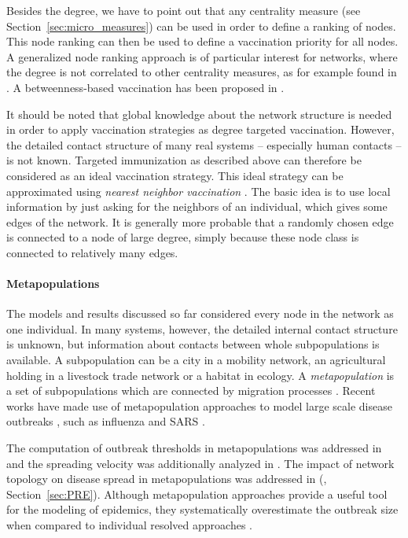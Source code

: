 Besides the degree, we have to point out that any centrality measure (see Section~\ref{sec:micro_measures}) can be used in order to define a ranking of nodes.
This node ranking can then be used to define a vaccination priority for all nodes.
A generalized node ranking approach is of particular interest for networks, where the degree is not correlated to other centrality measures, as for example found in \citep{Guimera:2005p5232}.
A betweenness-based vaccination has been proposed in \citep{holme:2002}.

It should be noted that global knowledge about the network structure is needed in order to apply vaccination strategies as degree targeted vaccination.
However, the detailed contact structure of many real systems -- especially human contacts -- is not known.
Targeted immunization as described above can therefore be considered as an ideal vaccination strategy.
This ideal strategy can be approximated using \emph{nearest neighbor vaccination} \citep{Cohen:PRL}.
The basic idea is to use local information by just asking for the neighbors of an individual, which gives some edges of the network.
It is generally more probable that a randomly chosen edge is connected to a node of large degree, simply because these node class is connected to relatively many edges.

\paragraph{Metapopulations\color{Cayenne}{.}}
The models and results discussed so far considered every node in the network as one individual.
In many systems, however, the detailed internal contact structure is unknown, but information about contacts between whole subpopulations is available.
A subpopulation can be a city in a mobility network, an agricultural holding in a livestock trade network or a habitat in ecology. 
A \emph{metapopulation} is a set of subpopulations which are connected by migration processes \citep{Grenfell:1997ts,Hanski:1998,dynamical_processes}.
Recent works have made use of metapopulation approaches to model large scale disease outbreaks \citep{VittoriaColizza02142006}, such as influenza \citep{DuyguBalcan12222009} and SARS \citep{Hufnagel:2004p27}.

The computation of outbreak thresholds in metapopulations was addressed in \citep{Colizza:2007p6276,Colizza:2007p5906} and the spreading velocity was additionally analyzed in \citep{Belik:2011ke}.
The impact of network topology on disease spread in metapopulations was addressed in (\citet{Lentz:2012pre}, Section~\ref{sec:PRE}).
Although metapopulation approaches provide a useful tool for the modeling of epidemics, they systematically overestimate the outbreak size when compared to individual resolved approaches \citep{Keeling11052010}.

